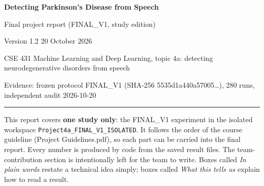 \documentclass[11pt,a4paper]{article}
\begin{document}
\begin{center}{\LARGE\bfseries Detecting Parkinson's Disease from Speech\par}\vspace{6pt}
{\Large Final project report (FINAL\_V1, study edition)\par}\vspace{4pt}
{\large Version 1.2 \textperiodcentered{} 20 October 2026\par}\vspace{6pt}
{\normalsize CSE 431 Machine Learning and Deep Learning, topic 4a: detecting neurodegenerative disorders from speech\par}\vspace{3pt}
{\small Evidence: frozen protocol FINAL\_V1 (SHA-256 5535d1a440a57005\ldots), 280 runs, independent audit \textperiodcentered{} 2026-10-20\par}\end{center}
\vspace{4pt}\hrule\vspace{6pt}
\tableofcontents
\newpage
\begin{tcolorbox}[colback=gray!5,colframe=gray!60!black,boxrule=0.5pt,arc=2pt,left=5pt,right=5pt,top=3pt,bottom=3pt,title={\small\bfseries Note}]\small This report covers \textbf{one study only}: the FINAL\_V1 experiment in the isolated workspace \texttt{Project4a\_\allowbreak{}FINAL\_\allowbreak{}V1\_\allowbreak{}ISOLATED}. It follows the order of the course guideline (Project Guidelines.pdf), so each part can be carried into the final report. Every number is produced by code from the saved result files. The team-contribution section is intentionally left for the team to write. Boxes called \emph{In plain words} restate a technical idea simply; boxes called \emph{What this tells us} explain how to read a result.\end{tcolorbox}
\end{document}

